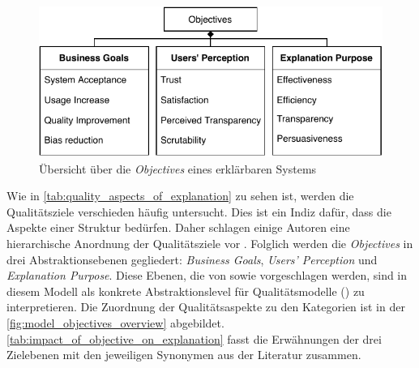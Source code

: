\begin{figure}[b!]
    \begin{center}
        \includegraphics{contents/05_model_description/res/model_objectives_overview.pdf}
    \end{center}
    \caption{Übersicht über die \textit{Objectives} eines erklärbaren Systems}
    \label{fig:model_objectives_overview}
\end{figure}

Wie in \autoref{tab:quality_aspects_of_explanation} zu sehen ist, werden die Qualitätsziele verschieden häufig untersucht. Dies ist ein Indiz dafür, dass die Aspekte einer Struktur bedürfen. Daher schlagen einige Autoren eine hierarchische Anordnung der Qualitätsziele vor \cite{nunes_systematic_2017,tintarev2007survey,waa_evaluating_2021}. Folglich werden die \textit{Objectives} in drei Abstraktionsebenen gegliedert: \textit{Business Goals}, \textit{Users' Perception} und \textit{Explanation Purpose}. Diese Ebenen, die von \citeauthor{nunes_systematic_2017} sowie \citeauthor{tintarev2007survey} vorgeschlagen werden, sind in diesem Modell als konkrete Abstraktionslevel für Qualitätsmodelle (\cite[vgl.][]{schneider2012abenteuer}) zu interpretieren. Die Zuordnung der Qualitätsaspekte zu den Kategorien ist in der \autoref{fig:model_objectives_overview} abgebildet. \autoref{tab:impact_of_objective_on_explanation} fasst die Erwähnungen der drei Zielebenen mit den jeweiligen Synonymen aus der Literatur zusammen.

